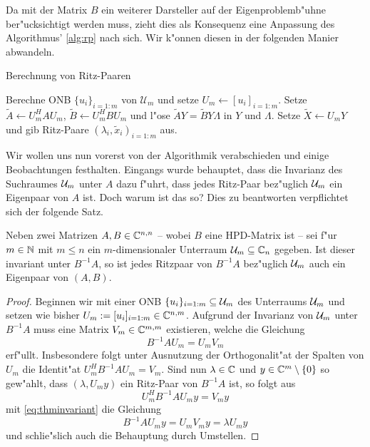 Da mit der Matrix $B$ ein weiterer Darsteller auf der Eigenproblemb"uhne ber"ucksichtigt werden muss, zieht dies als Konsequenz eine Anpassung des Algorithmus' \ref{alg:rp} nach sich. Wir k"onnen diesen in der folgenden Manier abwandeln.

\begin{algorithm}\label{alg:rp}
\caption{Berechnung von Ritz-Paaren}
\begin{algorithmic}[1]
\State Berechne ONB $\{u_i\}_{i=1:m}$ von $\mathcal{U}_m$ und setze $U_m\gets[u_i]_{i=1:m}$.
\State Setze $\widetilde{A}\gets U_m^H A U_m$,
$\widetilde{B} \gets U_m^H BU_m$ und
l"ose $\widetilde{A}Y = \widetilde{B}Y \Lambda$ in $Y$ und $\Lambda$.
\State Setze $\widetilde{X} \gets U_m Y$ und gib Ritz-Paare $(\lambda_i, \widetilde{x}_i)_{i=1:m}$ aus.
\end{algorithmic}
\end{algorithm}

Wir wollen uns nun vorerst von der Algorithmik verabschieden und einige Beobachtungen
festhalten. Eingangs wurde behauptet, dass die Invarianz des Suchraumes $\mathcal{U}_m$ unter
$A$ dazu f"uhrt, dass jedes Ritz-Paar bez"uglich $\mathcal{U}_m$ ein Eigenpaar von $A$ ist.
Doch warum ist das so? Dies zu beantworten verpflichtet sich der folgende Satz.

\begin{thm}\label{thm:invariant}
Neben zwei Matrizen $A,B\in\mathbb{C}^{n,n}$ -- wobei $B$ eine HPD-Matrix ist -- sei f"ur
$m\in\mathbb{N}$ mit $m\le n$ ein $m$-dimensionaler Unterraum $\mathcal{U}_m \subseteq \mathbb{C}_n$ gegeben.
Ist dieser invariant unter $B^{-1}A$, so ist jedes Ritzpaar von $B^{-1}A$
bez"uglich $\mathcal{U}_m$ auch ein Eigenpaar von $(A,B)$.
\end{thm}

\begin{proof}
Beginnen wir mit einer ONB $\{u_i\}_{i=1:m}\subseteq\mathcal{U}_m$ des Unterraums $\mathcal{U}_m$
und setzen wie bisher $U_m := [u_i]_{i=1:m}\in\mathbb{C}^{n,m}$. Aufgrund der Invarianz
von $\mathcal{U}_m$ unter $B^{-1}A$ muss eine Matrix $V_m \in \mathbb{C}^{m,m}$ existieren, welche
die Gleichung
\begin{equation}\label{eq:thminvariant}
B^{-1}A U_m = U_m V_m
\end{equation}
erf"ullt. Insbesondere folgt unter Ausnutzung der Orthogonalit"at der Spalten
von $U_m$ die Identit"at $U_m^H B^{-1}A U_m = V_m$.
Sind nun $\lambda\in\mathbb{C}$ und $y\in\mathbb{C}^m\setminus\{0\}$ so gew"ahlt, dass $(\lambda, U_m y)$
ein Ritz-Paar von $B^{-1}A$ ist, so folgt aus
\[
U_m^H B^{-1}A U_m y = V_m y
\]
mit \eqref{eq:thminvariant} die Gleichung
\[
B^{-1}AU_m y = U_m V_m y = \lambda U_m y
\]
und schlie"slich auch die Behauptung durch Umstellen.
\end{proof}

